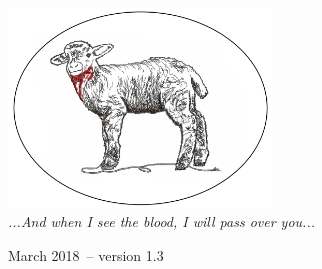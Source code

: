 \documentclass[10pt,oneside,footinclude=true,headinclude=true]{scrbook} %
\begin{document}
\begin{titlepage}
\begin{center}
\large \hfill \vfill

\begingroup
\color{RoyalPurple} \\
\bigskip
\color{RoyalPurple} \\ %
\bigskip
\endgroup

\vfill
\includegraphics[width=7cm]{lamb3oval} \\


\textit{...And when I see the blood, I will pass over you...} \\ \medskip %

March 2018\ -- version 1.3 %

\vfill
\end{center}
\end{titlepage}
    

\end{document}
